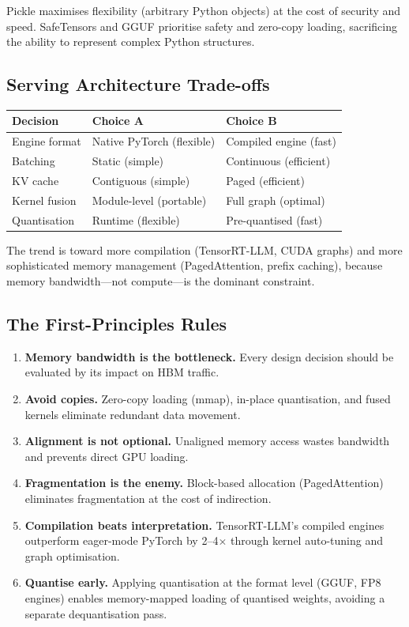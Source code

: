 \documentclass[11pt,a4paper]{article}
\theoremstyle{definition}
\begin{document}
Pickle maximises flexibility (arbitrary Python objects) at the cost of security and speed. SafeTensors and GGUF prioritise safety and zero-copy loading, sacrificing the ability to represent complex Python structures.

\subsection{Serving Architecture Trade-offs}

\begin{center}
	\begin{tabular}{p{5cm}p{5cm}p{5cm}}
		\toprule
		\textbf{Decision} & \textbf{Choice A}         & \textbf{Choice B}      \\
		\midrule
		Engine format     & Native PyTorch (flexible) & Compiled engine (fast) \\
		Batching          & Static (simple)           & Continuous (efficient) \\
		KV cache          & Contiguous (simple)       & Paged (efficient)      \\
		Kernel fusion     & Module-level (portable)   & Full graph (optimal)   \\
		Quantisation      & Runtime (flexible)        & Pre-quantised (fast)   \\
		\bottomrule
	\end{tabular}
\end{center}

The trend is toward more compilation (TensorRT-LLM, CUDA graphs) and more sophisticated memory management (PagedAttention, prefix caching), because memory bandwidth---not compute---is the dominant constraint.

\subsection{The First-Principles Rules}

\begin{enumerate}
	\item \textbf{Memory bandwidth is the bottleneck.} Every design decision should be evaluated by its impact on HBM traffic.
	\item \textbf{Avoid copies.} Zero-copy loading (mmap), in-place quantisation, and fused kernels eliminate redundant data movement.
	\item \textbf{Alignment is not optional.} Unaligned memory access wastes bandwidth and prevents direct GPU loading.
	\item \textbf{Fragmentation is the enemy.} Block-based allocation (PagedAttention) eliminates fragmentation at the cost of indirection.
	\item \textbf{Compilation beats interpretation.} TensorRT-LLM's compiled engines outperform eager-mode PyTorch by 2--4$\times$ through kernel auto-tuning and graph optimisation.
	\item \textbf{Quantise early.} Applying quantisation at the format level (GGUF, FP8 engines) enables memory-mapped loading of quantised weights, avoiding a separate dequantisation pass.
\end{enumerate}
\end{document}

